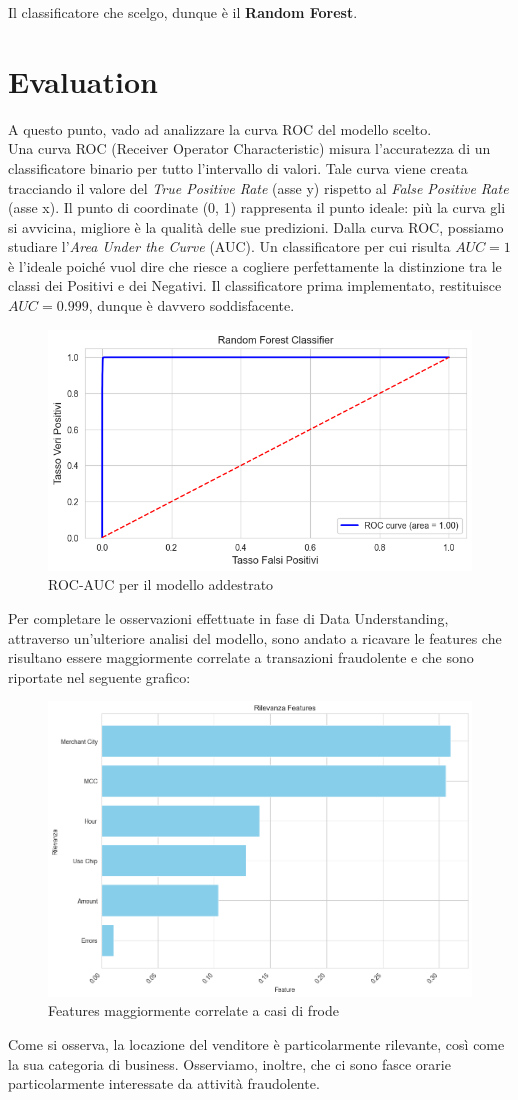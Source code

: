 \documentclass[]{article}
\begin{document}
    Il classificatore che scelgo, dunque è il \textbf{Random Forest}.
\section{Evaluation}
    A questo punto, vado ad analizzare la curva ROC del modello scelto.\\
    Una curva ROC (Receiver Operator Characteristic) misura l'accuratezza di un classificatore binario per tutto l'intervallo di valori. Tale curva viene creata tracciando il valore del \textit{True Positive Rate} (asse y) rispetto al \textit{False Positive Rate} (asse x). Il punto di coordinate (0, 1) rappresenta il punto ideale: più la curva gli si avvicina, migliore è la qualità delle sue predizioni. Dalla curva ROC, possiamo studiare l'\textit{Area Under the Curve} (AUC). Un classificatore per cui risulta $AUC=1$ è l'ideale poiché vuol dire che riesce a cogliere perfettamente la distinzione tra le classi dei Positivi e dei Negativi.
    Il classificatore prima implementato, restituisce $AUC=0.999$, dunque è davvero soddisfacente.
    \begin{figure}[H]
            \centering
            \includegraphics[width=.55\textwidth]{img/RF-ROC-AUC.png}
            \caption[short]{ROC-AUC per il modello addestrato}
    \end{figure}
    Per completare le osservazioni effettuate in fase di Data Understanding, attraverso un'ulteriore analisi del modello, sono andato a ricavare le features che risultano essere maggiormente correlate a transazioni fraudolente e che sono riportate nel seguente grafico:
    \begin{figure}[H]
            \centering
            \includegraphics[width=.65\textwidth]{img/RilevanzaFeatures.png}
            \caption[short]{Features maggiormente correlate a casi di frode}
    \end{figure}
    Come si osserva, la locazione del venditore è particolarmente rilevante, così come la sua categoria di business. Osserviamo, inoltre, che ci sono fasce orarie particolarmente interessate da attività fraudolente.
\end{document}
